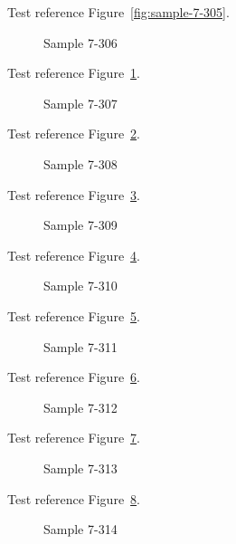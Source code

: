Test reference Figure~\ref{fig:sample-7-305}.

\begin{figure}[tbhp]
\caption{Sample 7-306}
\label{fig:sample-7-306}
\end{figure}

Test reference Figure~\ref{fig:sample-7-306}.

\begin{figure}[tbhp]
\caption{Sample 7-307}
\label{fig:sample-7-307}
\end{figure}

Test reference Figure~\ref{fig:sample-7-307}.

\begin{figure}[tbhp]
\caption{Sample 7-308}
\label{fig:sample-7-308}
\end{figure}

Test reference Figure~\ref{fig:sample-7-308}.

\begin{figure}[tbhp]
\caption{Sample 7-309}
\label{fig:sample-7-309}
\end{figure}

Test reference Figure~\ref{fig:sample-7-309}.

\begin{figure}[tbhp]
\caption{Sample 7-310}
\label{fig:sample-7-310}
\end{figure}

Test reference Figure~\ref{fig:sample-7-310}.

\begin{figure}[tbhp]
\caption{Sample 7-311}
\label{fig:sample-7-311}
\end{figure}

Test reference Figure~\ref{fig:sample-7-311}.

\begin{figure}[tbhp]
\caption{Sample 7-312}
\label{fig:sample-7-312}
\end{figure}

Test reference Figure~\ref{fig:sample-7-312}.

\begin{figure}[tbhp]
\caption{Sample 7-313}
\label{fig:sample-7-313}
\end{figure}

Test reference Figure~\ref{fig:sample-7-313}.

\begin{figure}[tbhp]
\caption{Sample 7-314}
\label{fig:sample-7-314}
\end{figure}

